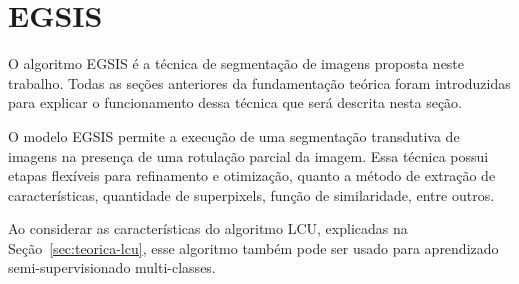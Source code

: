 \begin{figure}[h!]
        \captionsetup{width=16cm}
		\centering
\end{figure}

\newpage
\section{EGSIS}\label{sec:teorica-egsis}

O algoritmo \gls{EGSIS} é a técnica de segmentação de imagens
proposta neste trabalho. Todas as seções anteriores da fundamentação
teórica foram introduzidas para explicar o funcionamento dessa técnica
que será descrita nesta seção.

O modelo \gls{EGSIS} permite a execução de uma segmentação transdutiva
de imagens na presença de uma rotulação parcial da imagem. Essa
técnica possui etapas flexíveis para refinamento e otimização, quanto
a método de extração de características, quantidade de superpixels,
função de similaridade, entre outros.

Ao considerar as características do algoritmo LCU, explicadas na
Seção~\ref{sec:teorica-lcu}, esse algoritmo também pode ser usado para
aprendizado semi-supervisionado multi-classes.

